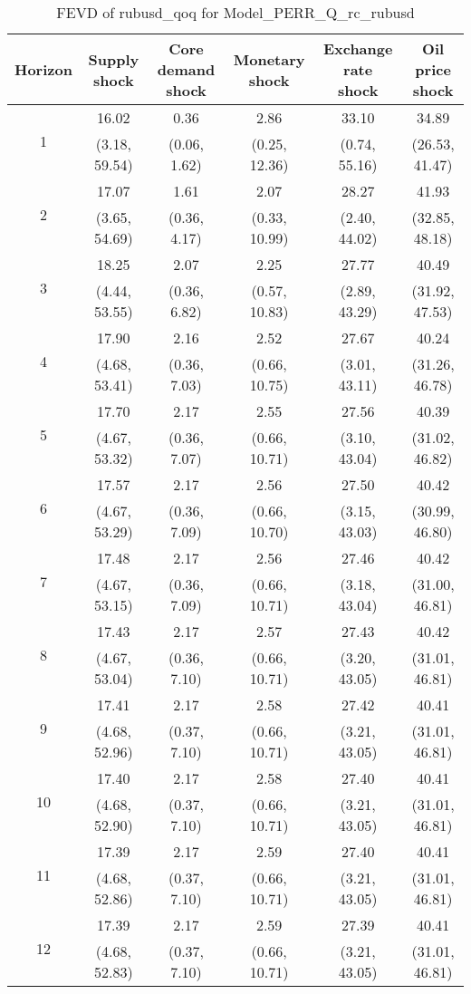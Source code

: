 \documentclass{article}
\begin{document}
\begin{table}
	\footnotesize
	\caption{FEVD of rubusd_qoq for Model_PERR_Q_rc_rubusd}
	\begin{tabular}{cccccc}
		Horizon & Supply shock & Core demand shock & Monetary shock & Exchange rate shock & Oil price shock\\ \hline
		\multirow{2}{*}{1} & 16.02 & 0.36 & 2.86 & 33.10 & 34.89\\
		 & (3.18, 59.54) & (0.06, 1.62) & (0.25, 12.36) & (0.74, 55.16) & (26.53, 41.47)\\
		\multirow{2}{*}{2} & 17.07 & 1.61 & 2.07 & 28.27 & 41.93\\
		 & (3.65, 54.69) & (0.36, 4.17) & (0.33, 10.99) & (2.40, 44.02) & (32.85, 48.18)\\
		\multirow{2}{*}{3} & 18.25 & 2.07 & 2.25 & 27.77 & 40.49\\
		 & (4.44, 53.55) & (0.36, 6.82) & (0.57, 10.83) & (2.89, 43.29) & (31.92, 47.53)\\
		\multirow{2}{*}{4} & 17.90 & 2.16 & 2.52 & 27.67 & 40.24\\
		 & (4.68, 53.41) & (0.36, 7.03) & (0.66, 10.75) & (3.01, 43.11) & (31.26, 46.78)\\
		\multirow{2}{*}{5} & 17.70 & 2.17 & 2.55 & 27.56 & 40.39\\
		 & (4.67, 53.32) & (0.36, 7.07) & (0.66, 10.71) & (3.10, 43.04) & (31.02, 46.82)\\
		\multirow{2}{*}{6} & 17.57 & 2.17 & 2.56 & 27.50 & 40.42\\
		 & (4.67, 53.29) & (0.36, 7.09) & (0.66, 10.70) & (3.15, 43.03) & (30.99, 46.80)\\
		\multirow{2}{*}{7} & 17.48 & 2.17 & 2.56 & 27.46 & 40.42\\
		 & (4.67, 53.15) & (0.36, 7.09) & (0.66, 10.71) & (3.18, 43.04) & (31.00, 46.81)\\
		\multirow{2}{*}{8} & 17.43 & 2.17 & 2.57 & 27.43 & 40.42\\
		 & (4.67, 53.04) & (0.36, 7.10) & (0.66, 10.71) & (3.20, 43.05) & (31.01, 46.81)\\
		\multirow{2}{*}{9} & 17.41 & 2.17 & 2.58 & 27.42 & 40.41\\
		 & (4.68, 52.96) & (0.37, 7.10) & (0.66, 10.71) & (3.21, 43.05) & (31.01, 46.81)\\
		\multirow{2}{*}{10} & 17.40 & 2.17 & 2.58 & 27.40 & 40.41\\
		 & (4.68, 52.90) & (0.37, 7.10) & (0.66, 10.71) & (3.21, 43.05) & (31.01, 46.81)\\
		\multirow{2}{*}{11} & 17.39 & 2.17 & 2.59 & 27.40 & 40.41\\
		 & (4.68, 52.86) & (0.37, 7.10) & (0.66, 10.71) & (3.21, 43.05) & (31.01, 46.81)\\
		\multirow{2}{*}{12} & 17.39 & 2.17 & 2.59 & 27.39 & 40.41\\
		 & (4.68, 52.83) & (0.37, 7.10) & (0.66, 10.71) & (3.21, 43.05) & (31.01, 46.81)\\
	\end{tabular}
\label{tab:fevd-Model_PERR_Q_rc_rubusd-rubusd_qoq}
\end{table}
\end{document}
